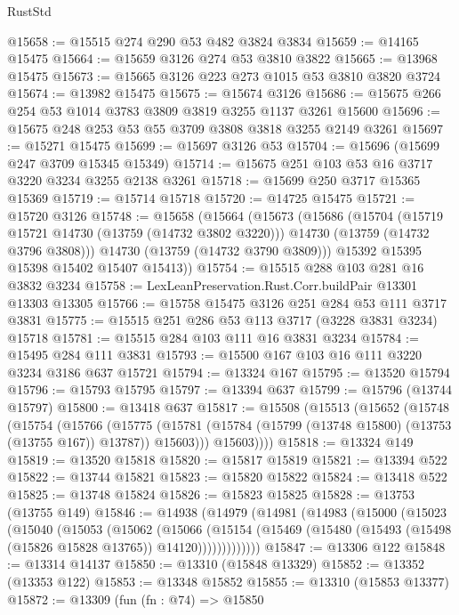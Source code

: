 \begin{lexlean}{RustStd}
\begin{coremodule}
@15658 := @15515 @274 @290 @53 @482 @3824 @3834
@15659 := @14165 @15475
@15664 := @15659 @3126 @274 @53 @3810 @3822
@15665 := @13968 @15475
@15673 := @15665 @3126 @223 @273 @1015 @53 @3810 @3820 @3724
@15674 := @13982 @15475
@15675 := @15674 @3126
@15686 := @15675 @266 @254 @53 @1014 @3783 @3809 @3819 @3255 @1137 @3261 @15600
@15696 := @15675 @248 @253 @53 @55 @3709 @3808 @3818 @3255 @2149 @3261
@15697 := @15271 @15475
@15699 := @15697 @3126 @53
@15704 := @15696 (@15699 @247 @3709 @15345 @15349)
@15714 := @15675 @251 @103 @53 @16 @3717 @3220 @3234 @3255 @2138 @3261
@15718 := @15699 @250 @3717 @15365 @15369
@15719 := @15714 @15718
@15720 := @14725 @15475
@15721 := @15720 @3126
@15748 := @15658
    (@15664
      (@15673
        (@15686
          (@15704
            (@15719 @15721 @14730 (@13759 (@14732 @3802 @3220)))
            @14730
            (@13759 (@14732 @3796 @3808)))
          @14730
          (@13759 (@14732 @3790 @3809)))
        @15392
        @15395
        @15398
        @15402
        @15407
        @15413))
@15754 := @15515 @288 @103 @281 @16 @3832 @3234
@15758 := LexLeanPreservation.Rust.Corr.buildPair @13301 @13303 @13305
@15766 := @15758 @15475 @3126 @251 @284 @53 @111 @3717 @3831
@15775 := @15515 @251 @286 @53 @113 @3717 (@3228 @3831 @3234) @15718
@15781 := @15515 @284 @103 @111 @16 @3831 @3234
@15784 := @15495 @284 @111 @3831
@15793 := @15500 @167 @103 @16 @111 @3220 @3234 @3186 @637 @15721
@15794 := @13324 @167
@15795 := @13520 @15794
@15796 := @15793 @15795
@15797 := @13394 @637
@15799 := @15796 (@13744 @15797)
@15800 := @13418 @637
@15817 := @15508
    (@15513
      (@15652
        (@15748
          (@15754
            (@15766
              (@15775
                (@15781 (@15784 (@15799 (@13748 @15800) (@13753 (@13755 @167)) @13787)) @15603)))
            @15603))))
@15818 := @13324 @149
@15819 := @13520 @15818
@15820 := @15817 @15819
@15821 := @13394 @522
@15822 := @13744 @15821
@15823 := @15820 @15822
@15824 := @13418 @522
@15825 := @13748 @15824
@15826 := @15823 @15825
@15828 := @13753 (@13755 @149)
@15846 := @14938
    (@14979
      (@14981
        (@14983
          (@15000
            (@15023
              (@15040
                (@15053
                  (@15062
                    (@15066
                      (@15154
                        (@15469 (@15480 (@15493 (@15498 (@15826 @15828 @13765)) @14120)))))))))))))
@15847 := @13306 @122
@15848 := @13314 @14137
@15850 := @13310 (@15848 @13329)
@15852 := @13352 (@13353 @122)
@15853 := @13348 @15852
@15855 := @13310 (@15853 @13377)
@15872 := @13309
    (fun (fn : @74) =>
    @15850

\end{coremodule}
\end{lexlean}
